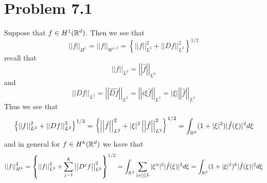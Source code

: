 \documentclass[12pt]{report}
\newcommand{\norm}[1]{\left|\left|#1\right|\right|}
\begin{document}
\maketitle
\section*{Problem 7.1}
Suppose that $f \in H^1(\mathbb{R}^d)$. Then we see that
\begin{equation*}
  \norm{f}_{H^1} = \norm{f}_{W^{1,2}} = \left\{ \norm{f}^2_{L^2} + \norm{Df}^2_{L^2}\right\}^{1/2}
\end{equation*}
recall that 
\begin{equation*}
  \norm{f}_{L^2} = \norm{\hat{f}}_{L^2} 
\end{equation*}
and
\begin{equation*}
  \norm{Df}_{L^2} = \norm{\widehat{Df}}_{L^2} = \norm{i\xi \hat{f}}_{L^2} = |\xi| \norm{\hat{f}}_{L^2}
\end{equation*}
Thus we see that
\begin{equation*}
 \left\{ \norm{f}^2_{L^2} + \norm{Df}^2_{L^2}\right\}^{1/2}= \left\{ \norm{\hat{f}}^2_{L^2} + |\xi|^2 \norm{\hat{f}}^2_{L^2}\right\}^{1/2} = \int_{\R^d} (1 + |\xi|^2) |\hat{f}(\xi)|^2 d\xi 
\end{equation*}
and in general for $f \in H^k(\mathbb{R}^d)$ we have that
\begin{equation*}
  \norm{f}^2_{H^k} = \left\{ \norm{f}^2_{L^2} + \sum_{j=1}^{k}\norm{D^jf}^2_{L^2}\right\}^{1/2} = \int_{\R^d} \sum_{|\alpha| \leq k} |\xi^{\alpha}|^2 |\hat{f}(\xi)|^2 d\xi = \int_{\R^d} (1 + |\xi|^2)^k |\hat{f}(\xi)|^2 d\xi
\end{equation*}
\end{document}
